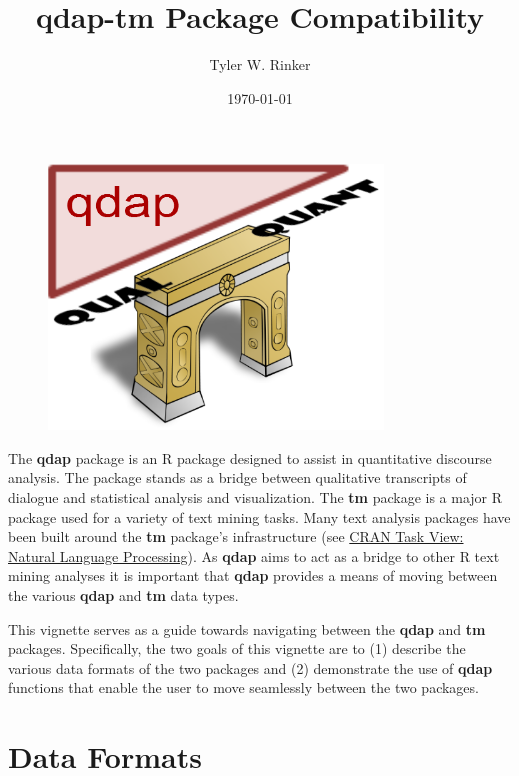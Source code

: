 \documentclass{article}\usepackage[]{graphicx}\usepackage[]{color}
\begin{document}
\title{qdap-tm Package Compatibility}
\author{Tyler W. Rinker}
\date{\today}
\maketitle

\begin{figure}[h!]
  \centering
    \includegraphics[width=3.5in]{imgs/qdaplogo.png}
\end{figure}

The \textbf{qdap} package \citep{R-qdap} is an R package designed to assist in quantitative discourse analysis. The package stands as a bridge between qualitative transcripts of dialogue and statistical analysis and visualization.  The \textbf{tm} package \citep{R-tm} is a major R \citep{R-core} package used for a variety of text mining tasks. Many text analysis packages have been built around the \textbf{tm} package's infrastructure (see \href{http://cran.r-project.org/web/views/NaturalLanguageProcessing.html}{CRAN Task View: Natural Language Processing}).  As \textbf{qdap} aims to act as a bridge to other R text mining analyses it is important that \textbf{qdap} provides a means of moving between the various \textbf{qdap} and \textbf{tm} data types.  

This vignette serves as a guide towards navigating between the \textbf{qdap} and \textbf{tm} packages.  Specifically, the two goals of this vignette are to (1) describe the various data formats of the two packages and (2) demonstrate the use of \textbf{qdap} functions that enable the user to move seamlessly between the two packages.




\newpage
\section{Data Formats}
\end{document}
